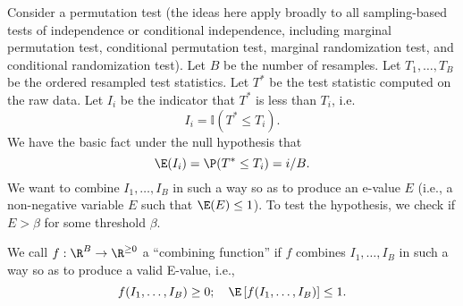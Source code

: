 \documentclass[12pt]{article}
\begin{document}
	

Consider a permutation test (the ideas here apply broadly to all sampling-based tests of independence or conditional independence, including marginal permutation test, conditional permutation test, marginal randomization test, and conditional randomization test). Let $B$ be the number of resamples. Let $T_{1}, \dots, T_B$ be the ordered resampled test statistics. Let $T^*$ be the test statistic computed on the raw data. Let $I_i$ be the indicator that $T^*$ is less than $T_i$, i.e. $$I_i = \mathbb{I}\left( T^* \leq T_i \right).$$ We have the basic fact under the null hypothesis that
$$\E(I_i) = \P(T^* \leq T_i) = i/B.$$ We want to combine $I_1, \dots, I_B$ in such a way so as to produce an e-value $E$ (i.e., a non-negative variable $E$ such that $\E(E) \leq 1$). To test the hypothesis, we check if $E > \beta$ for some threshold $\beta$.

We call $f: \R^B \to \R^{\geq 0}$ a ``combining function'' if $f$ combines $I_1, \dots, I_B$ in such a way so as to produce a valid E-value, i.e.,
$$f(I_1, \dots, I_B) \geq 0; \quad \E\left[f(I_1, \dots, I_B)\right] \leq 1.$$
\end{document}
